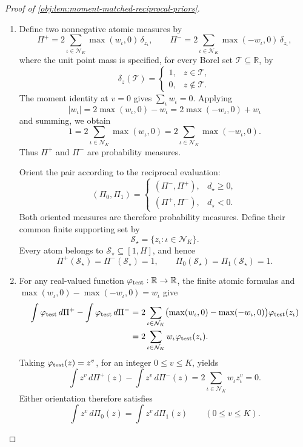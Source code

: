 \begin{proof}[Proof of \cref{obj:lem:moment-matched-reciprocal-priors}]
\begin{enumerate}
\item Define two nonnegative atomic measures by
\[
\Pi^+
=2\sum_{\iota\in\mathcal N_K}\max(w_\iota,0)\,\delta_{z_\iota},
\qquad
\Pi^-
=2\sum_{\iota\in\mathcal N_K}\max(-w_\iota,0)\,\delta_{z_\iota},
\]
where the unit point mass is specified, for every Borel set \(\mathcal T\subseteq\mathbb R\), by
\[
\delta_z(\mathcal T)
=
\begin{cases}
1,&z\in\mathcal T,\\
0,&z\notin\mathcal T.
\end{cases}
\]
The moment identity at \(v=0\) gives \(\sum_\iota w_\iota=0\). Applying
\[
|w_\iota|=2\max(w_\iota,0)-w_\iota
         =2\max(-w_\iota,0)+w_\iota
\]
and summing, we obtain
\[
1=2\sum_{\iota\in\mathcal N_K}\max(w_\iota,0)
 =2\sum_{\iota\in\mathcal N_K}\max(-w_\iota,0).
\]
Thus \(\Pi^+\) and \(\Pi^-\) are probability measures.

Orient the pair according to the reciprocal evaluation:
\[
(\Pi_0,\Pi_1)
=
\begin{cases}
(\Pi^-,\Pi^+),&d_\star\ge0,\\
(\Pi^+,\Pi^-),&d_\star<0.
\end{cases}
\]
Both oriented measures are therefore probability measures. Define their common finite supporting set by
\[
\mathcal S_\star=\{z_\iota:\iota\in\mathcal N_K\}.
\]
Every atom belongs to \(\mathcal S_\star\subseteq[1,H]\), and hence
\[
\Pi^+(\mathcal S_\star)=\Pi^-(\mathcal S_\star)=1,
\qquad
\Pi_0(\mathcal S_\star)=\Pi_1(\mathcal S_\star)=1.
\]

\item For any real-valued function \(\varphi_{\rm test}:\mathbb R\to\mathbb R\), the finite atomic formulas and
\(\max(w_\iota,0)-\max(-w_\iota,0)=w_\iota\) give
\[
\begin{aligned}
\int\varphi_{\rm test}\,d\Pi^+
-\int\varphi_{\rm test}\,d\Pi^-
&=2\sum_{\iota\in\mathcal N_K}
 \bigl(\max(w_\iota,0)-\max(-w_\iota,0)\bigr)
 \varphi_{\rm test}(z_\iota)\\
&=2\sum_{\iota\in\mathcal N_K}
 w_\iota\varphi_{\rm test}(z_\iota).
\end{aligned}
\]
Taking \(\varphi_{\rm test}(z)=z^v\), for an integer \(0\le v\le K\), yields
\[
\int z^v\,d\Pi^+(z)-\int z^v\,d\Pi^-(z)
=2\sum_{\iota\in\mathcal N_K}w_\iota z_\iota^v=0.
\]
Either orientation therefore satisfies
\[
\int z^v\,d\Pi_0(z)=\int z^v\,d\Pi_1(z)
\qquad(0\le v\le K).
\]


\end{enumerate}
\end{proof}
